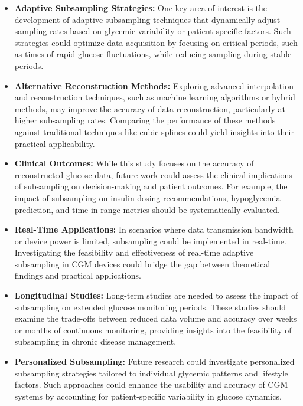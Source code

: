 \begin{itemize}
	\item \textbf{Adaptive Subsampling Strategies:} One key area of interest is the development of adaptive subsampling techniques that dynamically adjust sampling rates based on glycemic variability or patient-specific factors. Such strategies could optimize data acquisition by focusing on critical periods, such as times of rapid glucose fluctuations, while reducing sampling during stable periods.
	
	
	\item \textbf{Alternative Reconstruction Methods:} Exploring advanced interpolation and reconstruction techniques, such as machine learning algorithms or hybrid methods, may improve the accuracy of data reconstruction, particularly at higher subsampling rates. Comparing the performance of these methods against traditional techniques like cubic splines could yield insights into their practical applicability.
	
	\item \textbf{Clinical Outcomes:} While this study focuses on the accuracy of reconstructed glucose data, future work could assess the clinical implications of subsampling on decision-making and patient outcomes. For example, the impact of subsampling on insulin dosing recommendations, hypoglycemia prediction, and time-in-range metrics should be systematically evaluated.
	
	\item \textbf{Real-Time Applications:} In scenarios where data transmission bandwidth or device power is limited, subsampling could be implemented in real-time. Investigating the feasibility and effectiveness of real-time adaptive subsampling in CGM devices could bridge the gap between theoretical findings and practical applications.
	
	\item \textbf{Longitudinal Studies:} Long-term studies are needed to assess the impact of subsampling on extended glucose monitoring periods. These studies should examine the trade-offs between reduced data volume and accuracy over weeks or months of continuous monitoring, providing insights into the feasibility of subsampling in chronic disease management.
	
	\item \textbf{Personalized Subsampling:} Future research could investigate personalized subsampling strategies tailored to individual glycemic patterns and lifestyle factors. Such approaches could enhance the usability and accuracy of CGM systems by accounting for patient-specific variability in glucose dynamics.
\end{itemize}
